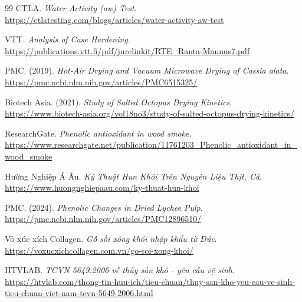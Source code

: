\documentclass[12pt,a4paper]{report}
\begin{document}
\begin{thebibliography}{99}
	 CTLA. \textit{Water Activity (aw) Test}. \url{https://ctlatesting.com/blogs/articles/water-activity-aw-test}
	
	 VTT. \textit{Analysis of Case Hardening}. \url{https://publications.vtt.fi/pdf/jurelinkit/RTE_Ranta-Maunus7.pdf}
	
	 PMC. (2019). \textit{Hot-Air Drying and Vacuum Microwave Drying of Cassia alata}. \url{https://pmc.ncbi.nlm.nih.gov/articles/PMC6515325/}
	
	 Biotech Asia. (2021). \textit{Study of Salted Octopus Drying Kinetics}. \url{https://www.biotech-asia.org/vol18no3/study-of-salted-octopus-drying-kinetics/}
	
	 ResearchGate. \textit{Phenolic antioxidant in wood smoke}. \url{https://www.researchgate.net/publication/11761203_Phenolic_antioxidant_in_wood_smoke}
	
	 Hướng Nghiệp Á Âu. \textit{Kỹ Thuật Hun Khói Trên Nguyên Liệu Thịt, Cá}. \url{https://www.huongnghiepaau.com/ky-thuat-hun-khoi}
	
	 PMC. (2024). \textit{Phenolic Changes in Dried Lychee Pulp}. \url{https://pmc.ncbi.nlm.nih.gov/articles/PMC12896510/}
	
	 Vỏ xúc xích Collagen. \textit{Gỗ sồi xông khói nhập khẩu từ Đức}. \url{https://voxucxichcollagen.com.vn/go-soi-xong-khoi/}
	
	 HTVLAB. \textit{TCVN 5649:2006 về thủy sản khô - yêu cầu vệ sinh}. \url{https://htvlab.com/thong-tin-huu-ich/tieu-chuan/thuy-san-kho-yeu-cau-ve-sinh-tieu-chuan-viet-nam-tcvn-5649-2006.html}
	
\end{thebibliography}
\end{document}
